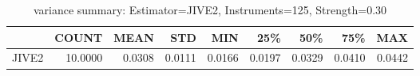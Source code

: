 \begin{table}[ht]
\centering
\caption{variance summary: Estimator=JIVE2, Instruments=125, Strength=0.30}
\begin{tabular}{lrrrrrrrr}
\toprule
 & COUNT & MEAN & STD & MIN & 25\% & 50\% & 75\% & MAX \\
\midrule
JIVE2 & 10.0000 & 0.0308 & 0.0111 & 0.0166 & 0.0197 & 0.0329 & 0.0410 & 0.0442 \\
\bottomrule
\end{tabular}
\end{table}
